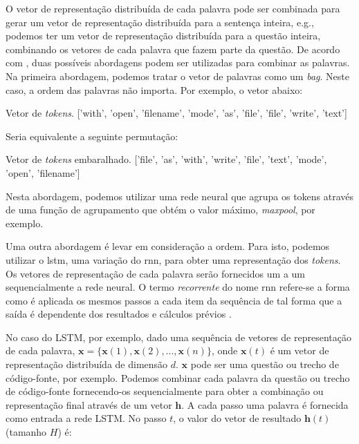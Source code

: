 O vetor de representação distribuída de cada palavra pode ser combinada para gerar um vetor de representação distribuída para a sentença inteira, e.g., podemos ter um vetor de representação distribuída para a questão inteira, combinando os vetores de cada palavra que fazem parte da questão. De acordo com \cite{cambronero-deep-learning-code-search:2019}, duas possíveis abordagens podem ser utilizadas para combinar as palavras. Na primeira abordagem, podemos tratar o vetor de palavras como um \textit{bag}. Neste caso, a ordem das palavras não importa. Por exemplo, o vetor abaixo:

\begin{mypythonembedding}{Vetor de \textit{tokens}.}
  ['with', 'open', 'filename', 'mode', 'as', 'file', 'file', 'write', 'text']
\end{mypythonembedding}

Seria equivalente a seguinte permutação:

\begin{mypythonembedding}{Vetor de \textit{tokens} embaralhado.}
['file', 'as', 'with', 'write', 'file', 'text', 'mode', 'open', 'filename']
\end{mypythonembedding}

Nesta abordagem, podemos utilizar uma rede neural que agrupa os tokens através de uma função de agrupamento que obtém o valor máximo, \textit{maxpool}, por exemplo.

Uma outra abordagem é levar em consideração a ordem. Para isto, podemos utilizar o \acrfull{lstm}, uma variação do \acrfull{rnn}, para obter uma representação dos \textit{tokens}. Os vetores de representação de cada palavra serão fornecidos um a um sequencialmente a rede neural. O termo \emph{recorrente} do nome \acrfull{rnn} refere-se a forma como é aplicada os mesmos passos a cada item da sequência de tal forma que a saída é dependente dos resultados e cálculos prévios \citep{tom-young:trends-deep-learning-nlp}.



No caso do LSTM, por exemplo, dado uma sequência de vetores de representação de cada palavra, $\bm{x} = \{ \bm{x}(1), \bm{x}(2), . . ., \bm{x}(n) \}$, onde $\bm{x}(t)$ é um vetor de representação distribuída de dimensão $d$. $\bm{x}$ pode ser uma questão ou trecho de código-fonte, por exemplo. Podemos combinar cada palavra da questão ou trecho de código-fonte fornecendo-os sequencialmente para obter a combinação ou representação final através de um vetor $\bm{h}$. A cada passo uma palavra é fornecida como entrada a rede LSTM. No passo $t$, o valor do vetor de resultado $\bm{h}(t)$ (tamanho $H$) é:

